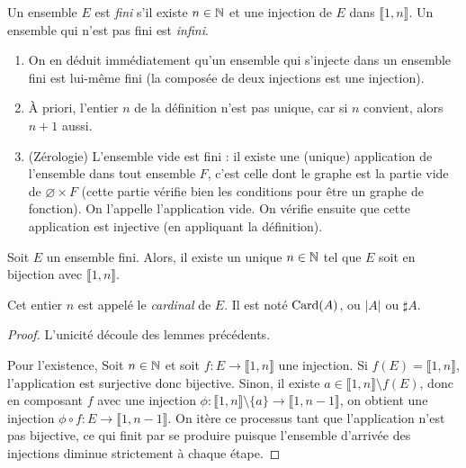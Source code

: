 \begin{definition}
Un ensemble $E$ est \emph{fini} s'il existe $n\in \mathbb{N}$ et une injection de $E$ dans $\llbracket 1,n\rrbracket$. Un ensemble qui n'est pas fini est \emph{infini}.
\end{definition}

\begin{remarque}
\begin{enumerate}[label=\alph*)]
\item On en déduit immédiatement qu'un ensemble qui s'injecte dans un ensemble fini est lui-même fini (la composée de deux injections est une injection).
\item À priori, l'entier $n$ de la définition n'est pas unique, car si $n$ convient, alors $n+1$ aussi.
\item (Zérologie) L'ensemble vide est fini : il existe une (unique) application de l'ensemble dans tout ensemble $F$, c'est celle dont le graphe est la partie vide de $\varnothing\times F$ (cette partie vérifie bien les conditions pour être un graphe de fonction). On l'appelle \og l'application vide\fg.
On vérifie ensuite que cette application est injective (en appliquant la définition).
\end{enumerate}
\end{remarque}


\begin{propdef}
Soit $E$ un ensemble fini. Alors, il existe un unique $n\in \mathbb{N}$ tel que $E$ soit en bijection avec $\llbracket 1,n\rrbracket$.

Cet entier $n$ est appelé le \emph{cardinal} de $E$. Il est noté $\operatorname{Card}(A)$, ou $|A|$ ou $\sharp A$.
\end{propdef}
\begin{proof}
L'unicité découle des lemmes précédents.

Pour l'existence, Soit $n\in \mathbb{N}$ et soit $f : E\to \llbracket 1,n\rrbracket$ une injection.
Si $f(E) = \llbracket 1,n\rrbracket$, l'application est surjective donc bijective.
Sinon, il existe $a\in \llbracket 1,n\rrbracket \setminus f(E)$, donc en composant $f$ avec une injection $\phi  : \llbracket 1,n\rrbracket \setminus \{a\} \to \llbracket 1,n-1\rrbracket$, on obtient une injection $\phi\circ f : E \to \llbracket 1,n-1\rrbracket$.
On itère ce processus tant que l'application n'est pas bijective, ce qui finit par se produire puisque l'ensemble d'arrivée des injections diminue strictement à chaque étape.
\end{proof}




